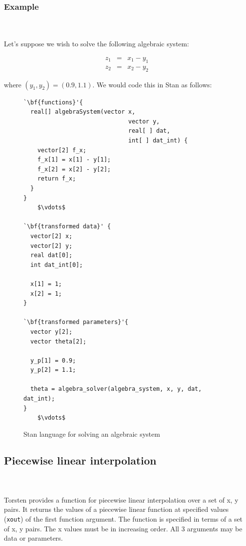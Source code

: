 \documentclass[11pt]{amsart}
\newenvironment{fmpage}[1]
     {\begin{lrbox}{\fmbox}\begin{minipage}{#1}}
     {\end{minipage}\end{lrbox}\fbox{\usebox{\fmbox}}}
\begin{document}
\subsubsection{Example} \ \\ \ \\
Let's suppose we wish to solve the following algebraic system:

\begin{eqnarray*}
  z_1 &=& x_1 - y_1  \\
  z_2 &=& x_2 - y_2
\end{eqnarray*} 

where $(y_1, y_2) = (0.9, 1.1)$. We would code this in Stan as follows:

\begin{figure}[htbp]
\caption{Stan language for solving an algebraic system}
\begin{center}
\begin{small}
\begin{fmpage}{\textwidth - .75in}
\begin{lstlisting}[basicstyle=\footnotesize\ttfamily,mathescape=true,flexiblecolumns=true,frame=single,escapeinside=`']
`\bf{functions}'{
  real[] algebraSystem(vector x,
                              vector y,
                              real[ ] dat,
                              int[ ] dat_int) {	        
    vector[2] f_x;
    f_x[1] = x[1] - y[1];
    f_x[2] = x[2] - y[2];
    return f_x;
  }
}
    $\vdots$

`\bf{transformed data}' {
  vector[2] x;
  vector[2] y;
  real dat[0];
  int dat_int[0];
  
  x[1] = 1;
  x[2] = 1;
}

`\bf{transformed parameters}'{
  vector y[2];
  vector theta[2];
  
  y_p[1] = 0.9;
  y_p[2] = 1.1;
  
  theta = algebra_solver(algebra_system, x, y, dat, dat_int);
}
    $\vdots$
\end{lstlisting}
\end{fmpage}
\end{small}
\end{center}
\label{algebraStan}
\end{figure}


\subsection{Piecewise linear interpolation}\ \\ \ \\
Torsten provides a function for piecewise linear interpolation over a
set of x, y pairs. It returns the values of a piecewise linear
function at specified values ({\tt xout}) of the first function argument. The
function is specified in terms of a set of x, y pairs. The x values
must be in increasing order. All 3 arguments may be data or
parameters. 
\end{document}
